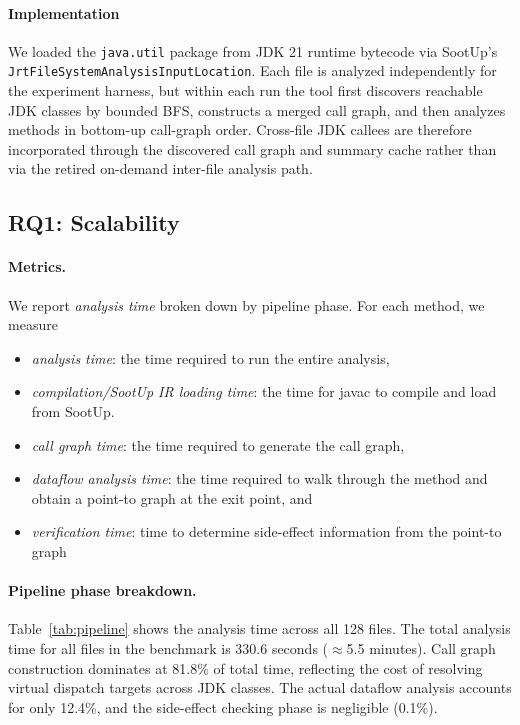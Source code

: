 \paragraph{Implementation}
We loaded the \texttt{java.util} package from JDK 21 runtime bytecode via SootUp's \newline \texttt{JrtFileSystemAnalysisInputLocation}.
Each file is analyzed independently for the experiment harness, but within each run the tool first discovers reachable JDK classes by bounded BFS, constructs a merged call graph, and then analyzes methods in bottom-up call-graph order.
Cross-file JDK callees are therefore incorporated through the discovered call graph and summary cache rather than via the retired on-demand inter-file analysis path.




\subsection{RQ1: Scalability}


\paragraph{Metrics.}
We report \emph{analysis time} broken down by pipeline phase. For each method, we measure
\begin{itemize}  
\item \textit{analysis time}: the time required to run the entire analysis, 
\item \textit{compilation/SootUp IR loading time}: the time for javac to compile and load from SootUp.  
\item \textit{call graph time}: the time required to generate the call graph,
\item \textit{dataflow analysis time}: the time required to walk through the method and obtain a point-to graph at the exit point, and
\item \textit{verification time}: time to determine side-effect information from the point-to graph 
\end{itemize}


\paragraph{Pipeline phase breakdown.}
Table~\ref{tab:pipeline} shows the analysis time across all 128 files.
The total analysis time for all files in the benchmark is 330.6 seconds ($\approx$5.5 minutes).
Call graph construction dominates at 81.8\% of total time, reflecting the cost of resolving virtual dispatch targets across JDK classes.
The actual dataflow analysis accounts for only 12.4\%, and the side-effect checking phase is negligible (0.1\%).

